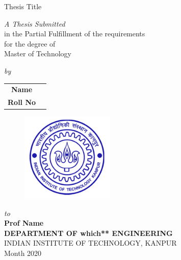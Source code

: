 \thispagestyle{empty}
\renewcommand{\baselinestretch}{1.5}
\vfill
    \begin{center}
        {\LARGE \sc Thesis Title}
        \end{center}
\vfill
\vspace{1cm}
    \begin{center}
        {\sl A Thesis Submitted}\\
         in the Partial Fulfillment of the requirements\\
         for the degree of\\
          {\sf Master of Technology}
    \end{center}
\vspace{2.5cm}
\begin{center}
        \sl by \\
    \begin{tabular}{ c c }
    {\bf    Name} 
    \\
    {\bf  Roll No}  
    \end{tabular}

\end{center}
\vspace*{.5cm}
\begin{figure}[ht]
\begin{center}
\includegraphics[width=1.75in]{iitk_logo}
\end{center}
\end{figure}
\vfill
\begin{center}
    \baselineskip
    {\sl to }\\
{\bf Prof Name}\\
{\bf DEPARTMENT OF which** ENGINEERING}\\

    {\large INDIAN INSTITUTE OF TECHNOLOGY, KANPUR}\\
    Month 2020\
\end{center}
